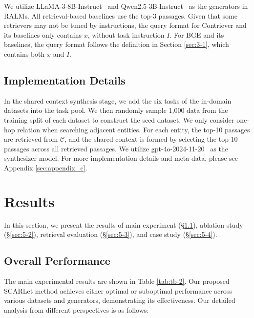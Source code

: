 \documentclass[11pt]{article}
\begin{document}
We utilize LLaMA-3-8B-Instruct~\citep{llama3modelcard} and Qwen2.5-3B-Instruct~\citep{qwen2.5} as the generators in RALMs. All retrieval-based baselines use the top-3 passages. Given that some retrievers may not be tuned by instructions, the query format for Contriever and its baselines only contains $x$, without task instruction $I$. For BGE and its baselines, the query format follows the definition in Section \ref{sec:3-1}, which contains both $x$ and $I$.








\subsection{Implementation Details}
\label{sec:4-3}

In the shared context synthesis stage, we add the six tasks of the in-domain datasets into the task pool. We then randomly sample 1,000 data from the training split of each dataset to construct the seed dataset. We only consider one-hop relation when searching adjacent entities. For each entity, the top-10 passages are retrieved from $\mathcal{C}$, and the shared context is formed by selecting the top-10 passages across all retrieved passages. We utilize gpt-4o-2024-11-20~\citep{gpt4o} as the synthesizer model. For more implementation details and meta data, please see Appendix \ref{sec:appendix_c}.








\section{Results}

In this section, we present the results of main experiment (\S \ref{sec:5-1}), ablation study (\S \ref{sec:5-2}), retrieval evaluation (\S \ref{sec:5-3}), and case study (\S \ref{sec:5-4}).

\subsection{Overall Performance}
\label{sec:5-1}

The main experimental results are shown in Table \ref{tab:tb-2}. Our proposed SCARLet method achieves either optimal or suboptimal performance across various datasets and generators, demonstrating its effectiveness. Our detailed analysis from different perspectives is as follows:
\end{document}
